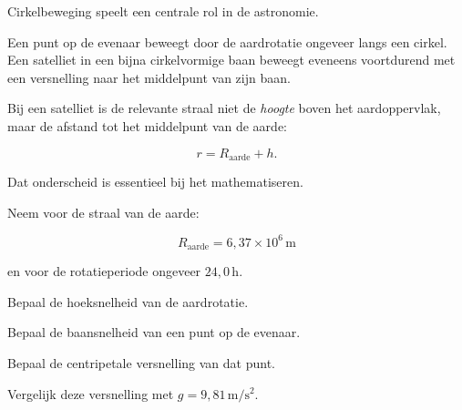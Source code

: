 \documentclass{ximera}
\begin{document}


Cirkelbeweging speelt een centrale rol in de astronomie.

Een punt op de evenaar beweegt door de aardrotatie ongeveer langs een
cirkel. Een satelliet in een bijna cirkelvormige baan beweegt eveneens
voortdurend met een versnelling naar het middelpunt van zijn baan.

Bij een satelliet is de relevante straal niet de \emph{hoogte} boven
het aardoppervlak, maar de afstand tot het middelpunt van de aarde:

\[
\boxed{
r=R_{\mathrm{aarde}}+h.
}
\]

Dat onderscheid is essentieel bij het mathematiseren.


\begin{oefening}{\oefU}

Neem voor de straal van de aarde:

\[
R_{\mathrm{aarde}}=6,37\times10^6\,\mathrm{m}
\]

en voor de rotatieperiode ongeveer $24,0\,\mathrm{h}$.

\begin{question}
Bepaal de hoeksnelheid van de aardrotatie.
\end{question}

\begin{question}
Bepaal de baansnelheid van een punt op de evenaar.
\end{question}

\begin{question}
Bepaal de centripetale versnelling van dat punt.
\end{question}

\begin{question}
Vergelijk deze versnelling met $g=9,81\,\mathrm{m/s^2}$.
\end{question}

\end{oefening}
\end{document}
